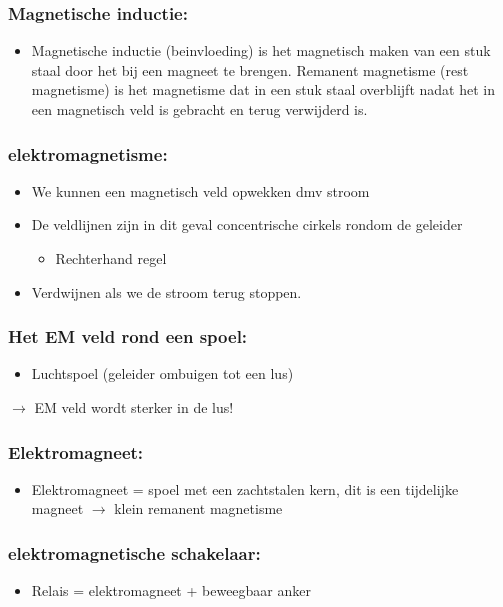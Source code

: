 \documentclass[12pt]{article}
\begin{document}
\subsubsection{Magnetische inductie:}
\begin{itemize}
    \item Magnetische inductie (beinvloeding) is het magnetisch maken van een stuk staal door het bij een magneet te brengen.
Remanent magnetisme (rest magnetisme) is het magnetisme dat in een stuk staal overblijft nadat het in een magnetisch veld is gebracht en terug verwijderd is.
\end{itemize}
\subsubsection{elektromagnetisme:}
\begin{itemize}
    \item We kunnen een magnetisch veld opwekken dmv stroom
    \item De veldlijnen zijn in dit geval concentrische cirkels rondom de geleider\begin{itemize}
        \item Rechterhand regel
    \end{itemize}
    \item Verdwijnen als we de stroom terug stoppen.
\end{itemize}
\subsubsection{Het EM veld rond een spoel:}
\begin{itemize}
    \item Luchtspoel (geleider ombuigen tot een lus)
\end{itemize}
$\rightarrow$ EM veld wordt sterker in de lus!
\subsubsection{Elektromagneet:}
\begin{itemize}
    \item Elektromagneet = spoel met een zachtstalen kern, dit is een tijdelijke magneet $\rightarrow$ klein remanent magnetisme
\end{itemize}
\subsubsection{elektromagnetische schakelaar:}
\begin{itemize}
    \item Relais = elektromagneet + beweegbaar anker
\end{itemize}
\end{document}
